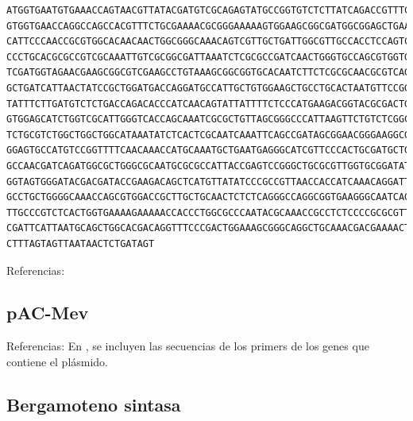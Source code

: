 \documentclass[12pt]{article}
\begin{document}
\begin{verbatim}
ATGGTGAATGTGAAACCAGTAACGTTATACGATGTCGCAGAGTATGCCGGTGTCTCTTATCAGACCGTTTCCCC
GTGGTGAACCAGGCCAGCCACGTTTCTGCGAAAACGCGGGAAAAAGTGGAAGCGGCGATGGCGGAGCTGAATTA
CATTCCCAACCGCGTGGCACAACAACTGGCGGGCAAACAGTCGTTGCTGATTGGCGTTGCCACCTCCAGTCTGG
CCCTGCACGCGCCGTCGCAAATTGTCGCGGCGATTAAATCTCGCGCCGATCAACTGGGTGCCAGCGTGGTGGTG
TCGATGGTAGAACGAAGCGGCGTCGAAGCCTGTAAAGCGGCGGTGCACAATCTTCTCGCGCAACGCGTCAGTGG
GCTGATCATTAACTATCCGCTGGATGACCAGGATGCCATTGCTGTGGAAGCTGCCTGCACTAATGTTCCGGCGT
TATTTCTTGATGTCTCTGACCAGACACCCATCAACAGTATTATTTTCTCCCATGAAGACGGTACGCGACTGGGC
GTGGAGCATCTGGTCGCATTGGGTCACCAGCAAATCGCGCTGTTAGCGGGCCCATTAAGTTCTGTCTCGGCGCG
TCTGCGTCTGGCTGGCTGGCATAAATATCTCACTCGCAATCAAATTCAGCCGATAGCGGAACGGGAAGGCGACT
GGAGTGCCATGTCCGGTTTTCAACAAACCATGCAAATGCTGAATGAGGGCATCGTTCCCACTGCGATGCTGGTT
GCCAACGATCAGATGGCGCTGGGCGCAATGCGCGCCATTACCGAGTCCGGGCTGCGCGTTGGTGCGGATATCTC
GGTAGTGGGATACGACGATACCGAAGACAGCTCATGTTATATCCCGCCGTTAACCACCATCAAACAGGATTTTC
GCCTGCTGGGGCAAACCAGCGTGGACCGCTTGCTGCAACTCTCTCAGGGCCAGGCGGTGAAGGGCAATCAGCTG
TTGCCCGTCTCACTGGTGAAAAGAAAAACCACCCTGGCGCCCAATACGCAAACCGCCTCTCCCCGCGCGTTGGC
CGATTCATTAATGCAGCTGGCACGACAGGTTTCCCGACTGGAAAGCGGGCAGGCTGCAAACGACGAAAACTACG
CTTTAGTAGTTAATAACTCTGATAGT
\end{verbatim}

Referencias: \cite{igemP}

\subsection{pAC-Mev}

Referencias: En \cite{harada09a}, se incluyen las secuencias de los primers de los genes que contiene el pl\'asmido.

\subsection{Bergamoteno sintasa}
\end{document}
